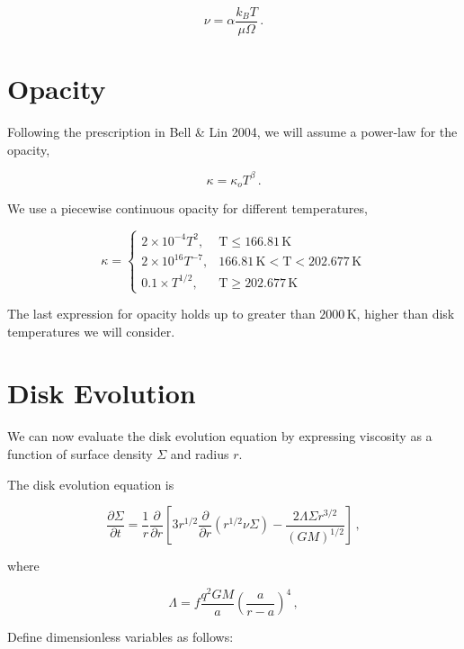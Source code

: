\documentclass{article}
\begin{document}
\begin{equation}
\nu = \alpha \frac{k_B T}{\mu \Omega}\,.
\end{equation}

\section{Opacity}

Following the prescription in Bell \& Lin 2004, we will assume a power-law for the opacity,

\begin{equation} \label{eq:op}
\kappa = \kappa_o T^\beta\,.
\end{equation} 

We use a piecewise continuous opacity  for different temperatures,

$$\kappa =
\begin{cases}
2\times 10^{-4} T^2, & \textrm{T} \leq 166.81\, \textrm{K} \\
2\times 10^{16} T^{-7}, & 166.81\, \textrm{K} <  \textrm{T} < 202.677\, \textrm{K} \\
0.1\times T^{1/2}, & \textrm{T} \geq 202.677\, \textrm{K}
\end{cases}
$$

The last expression for opacity holds up to greater than $2000$\,K, higher than disk temperatures we will consider.

\section{Disk Evolution}

We can now evaluate the disk evolution equation by expressing viscosity as a function of surface density $\Sigma$ and radius $r$.

The disk evolution equation is

\begin{equation} \label{eq:diskev}
\frac{\partial \Sigma}{\partial t} = \frac{1}{r} \frac{\partial}{\partial r} \left[3 r^{1/2} \frac{\partial}{\partial r} \left(r^{1/2} \nu \Sigma\right) - \frac{2 \Lambda \Sigma r^{3/2}}{(G M)^{1/2}}\right]\,,
\end{equation}


where 

\begin{equation}
\Lambda = f \frac{q^2 GM}{a} \left(\frac{a}{r-a}\right)^4\,,
\end{equation}

Define dimensionless variables as follows:
\end{document}
